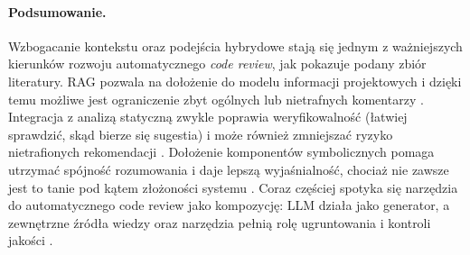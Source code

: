 \paragraph{Podsumowanie.}
Wzbogacanie kontekstu oraz podejścia hybrydowe stają się jednym z ważniejszych kierunków rozwoju automatycznego \emph{code review},
jak pokazuje podany zbiór literatury. RAG pozwala na dołożenie do modelu informacji projektowych i dzięki temu możliwe jest
ograniczenie zbyt ogólnych lub nietrafnych komentarzy \cite{Meng2025RARe,Ren2025HydraReviewer}.
Integracja z analizą statyczną zwykle poprawia weryfikowalność (łatwiej sprawdzić, skąd bierze się sugestia) i może również zmniejszać ryzyko nietrafionych 
rekomendacji \cite{Jaoua2025LLMStaticAnalyzersCR,Cihan2025EvaluatingLLMsForCodeReview}.
Dołożenie komponentów symbolicznych pomaga utrzymać spójność rozumowania i daje lepszą wyjaśnialność, chociaż nie zawsze jest to tanie pod kątem 
złożoności systemu \cite{Icoz2025SymbolicReasoning}. Coraz częściej spotyka się narzędzia do automatycznego code review jako kompozycję: LLM działa 
jako generator, a zewnętrzne źródła wiedzy oraz narzędzia pełnią rolę ugruntowania i kontroli jakości \cite{Tufano2024CodeReviewAutomation,Ramesh2025EricssonExperience}.
